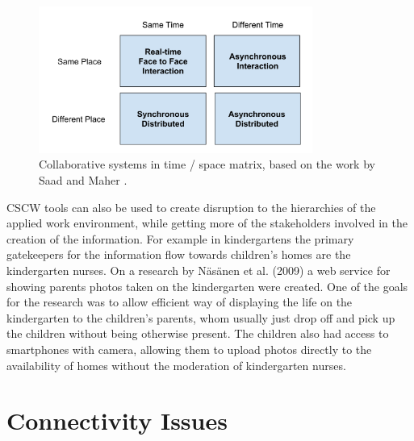 \begin{figure}[t]
\begin{center}
\includegraphics[width=0.8\textwidth]{assets/cscw-matrix.png}
\end{center}
\caption{Collaborative systems in time / space matrix, based on the work by Saad and Maher \cite{saad_shared_1996}.}
\label{fig:cscw-matrix}
\end{figure}


CSCW tools can also be used to create disruption to the hierarchies of the applied work environment, while getting more of the stakeholders involved in the creation of the information. For example in kindergartens the primary gatekeepers for the information flow towards children's homes are the kindergarten nurses. On a research by Näsänen et al. (2009) a web service for showing parents photos taken on the kindergarten were created. One of the goals for the research was to allow efficient way of displaying the life on the kindergarten to the children's parents, whom usually just drop off and pick up the children without being otherwise present. The children also had access to smartphones with camera, allowing them to upload photos directly to the availability of homes without the moderation of kindergarten nurses. \cite{nasanen_mobile_2009}








\section{Connectivity Issues}

